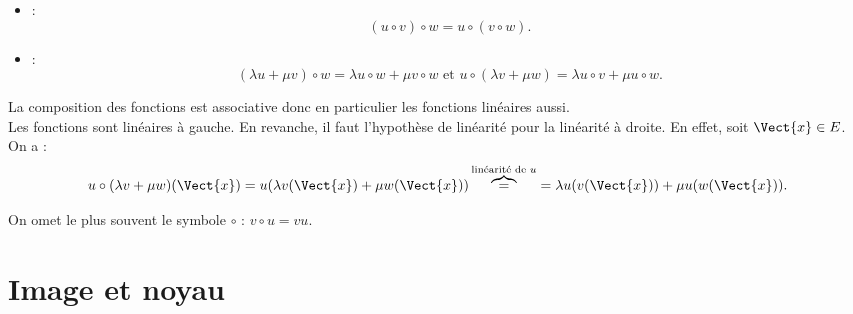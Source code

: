 \documentclass{book}
\begin{document}
 \begin{Proposition}
\begin{itemize}
\item
   : $$(u \circ v) \circ w =u \circ( v \circ w).$$
\item
   : 
  $$ (\lambda u + \mu v) \circ w = \lambda u\circ w + \mu v\circ w\text{ et }u\circ (\lambda v+ \mu w) =\lambda u\circ v + \mu u\circ w.$$
\end{itemize}
\end{Proposition}
\begin{Demonstration}
La composition des fonctions est associative donc en particulier les fonctions linéaires aussi.\\
Les fonctions sont linéaires à gauche. En revanche, il faut l'hypothèse de linéarité pour la linéarité à droite. En effet, soit $\Vect{x}\in E$. On a :
$$u\circ (\lambda v+ \mu w)(\Vect{x})=u(\lambda v(\Vect{x})+ \mu w(\Vect{x}))\overbrace{=}^{\text{linéarité de }u}=\lambda u(v(\Vect{x})) + \mu u(w(\Vect{x})).$$
\end{Demonstration}

\begin{Remarque} On omet le plus souvent le symbole  $\circ$ : $v\circ u =v u$.
\end{Remarque}




\section{Image et noyau}
\end{document}
